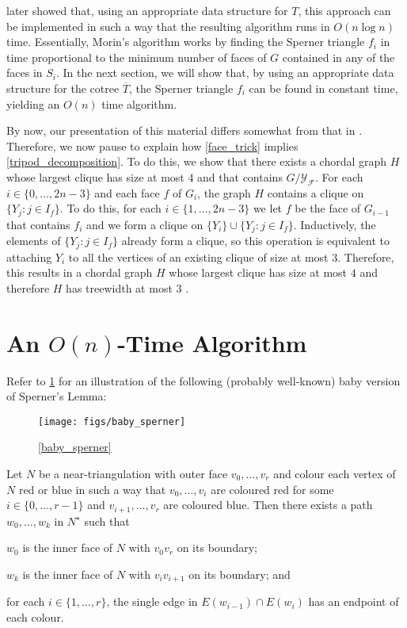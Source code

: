 \documentclass{patmorin}
\begin{document}
\citet{morin:fast} later showed that, using an appropriate data structure for $T$, this approach can be implemented in such a way that the resulting algorithm runs in $O(n\log n)$ time.  Essentially, Morin's algorithm works by finding the Sperner triangle $f_i$ in time proportional to the minimum number of faces of $G$ contained in any of the faces in $S_i$.  In the next section, we will show that, by using an appropriate data structure for the cotree $\overline{T}$, the Sperner triangle $f_i$ can be found in constant time, yielding an $O(n)$ time algorithm.

By now, our presentation of this material differs somewhat from that in \cite{dujmovic.joret.ea:planar,ueckerdt.wood.ea:improved}.  Therefore, we now pause to explain how \cref{face_trick} implies \cref{tripod_decomposition}.  To do this, we show that there exists a chordal graph $H$ whose largest clique has size at most $4$ and that contains $G/\mathcal{Y_F}$. For each $i\in\{0,\ldots,2n-3\}$ and each face $f$ of $G_i$, the graph $H$ contains a clique on $\{Y_j:j\in I_f\}$.  To do this, for each $i\in\{1,\ldots,2n-3\}$ we let $f$ be the face of $G_{i-1}$ that contains $f_i$ and we form a clique on $\{Y_i\}\cup\{Y_j:j\in I_f\}$.  Inductively, the elements of $\{Y_j:j\in I_f\}$ already form a clique, so this operation is equivalent to attaching $Y_i$ to all the vertices of an existing clique of size at most $3$. Therefore, this results in a chordal graph $H$ whose largest clique has size at most $4$ and therefore $H$ has treewidth at most $3$ \cite{gavril:intersection}.

\section{An $O(n)$-Time Algorithm}

Refer to \cref{baby_sperner_fig} for an illustration of the following (probably well-known) baby version of Sperner's Lemma:

\begin{figure}
  \begin{center}
    \texttt{[image: figs/baby\_sperner]}
  \end{center}
  \caption{\cref{baby_sperner}}
  \label{baby_sperner_fig}
\end{figure}

\begin{lem}\label{baby_sperner}
  Let $N$ be a near-triangulation with outer face $v_0,\ldots,v_r$ and colour each vertex of $N$ red or blue in such a way that $v_0,\ldots,v_i$ are coloured red for some $i\in\{0,\ldots,r-1\}$ and $v_{i+1},\ldots,v_r$ are coloured blue.  Then there exists a path $w_0,\ldots,w_k$ in $N^\star$ such that
  \begin{compactenum}
    \item $w_0$ is the inner face of $N$ with $v_0v_r$ on its boundary;
    \item $w_k$ is the inner face of $N$ with $v_iv_{i+1}$ on its boundary; and
    \item for each $i\in\{1,\ldots,r\}$, the single edge in $E(w_{i-1})\cap E(w_i)$ has an endpoint of each colour.
  \end{compactenum}
\end{lem}
\end{document}
